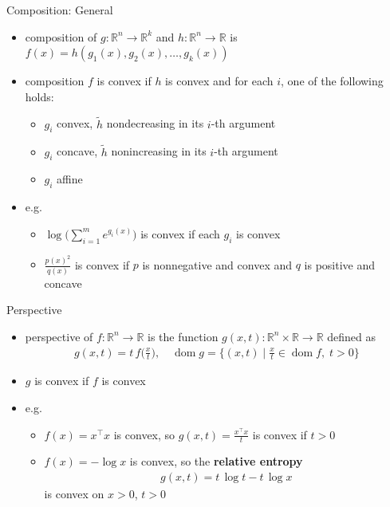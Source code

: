 \documentclass[10pt]{beamer}
\newcommand{\ds}{\displaystyle}
\DeclareMathOperator*{\dom}{dom}
\theoremstyle{definition}
\begin{document}
\begin{frame}{Composition: General}
  \begin{itemize}
    \item composition of $g:\mathbb{R}^n\to\mathbb{R}^k$ and $h:\mathbb{R}^n\to\mathbb{R}$ is $\ds f(x) = h(g_1(x), g_2(x),\ldots, g_k(x))$
    \item composition $f$ is convex if $h$ is convex and for each $i$, one of the following holds:
      \begin{itemize}
        \item $g_i$ convex, $\ds\widetilde{h}$ nondecreasing in its $i$-th argument
        \item $g_i$ concave, $\ds\widetilde{h}$ nonincreasing in its $i$-th argument
        \item $g_i$ affine
      \end{itemize}
    \item e.g.
      \begin{itemize}
        \item $\ds\log\Big(\sum_{i = 1}^m e^{g_i(x)}\Big)$ is convex if each $g_i$ is convex
        \item $\ds\frac{p(x)^2}{q(x)}$ is convex if $p$ is nonnegative and convex and $q$ is positive and concave
      \end{itemize}
  \end{itemize}
\end{frame}

\begin{frame}{Perspective}
  \begin{itemize}
    \item perspective of $f:\mathbb{R}^n\to\mathbb{R}$ is the function $\ds g(x, t):\mathbb{R}^n\times\mathbb{R}\to\mathbb{R}$ defined as 
      \begin{align*}
        g(x, t) = t\,f\Big(\frac{x}{t}\Big), \quad\dom g = \Big\{(x, t)\;\Big|\;\frac{x}{t}\in\dom f,\;t > 0\Big\}
      \end{align*}
    \item $g$ is convex if $f$ is convex
    \item e.g.
      \begin{itemize}
        \item $\ds f(x) = x^\top x$ is convex, so $\ds g(x, t) = \frac{x^\top x}{t}$ is convex if $t > 0$
        \item $\ds f(x) = -\log x$ is convex, so the {\bf relative entropy} 
          \begin{align*}
            g(x, t) = t\,\log t - t\,\log x
          \end{align*} 
          is convex on $x > 0$, $t > 0$ 
      \end{itemize}
  \end{itemize}
\end{frame}
\end{document}
